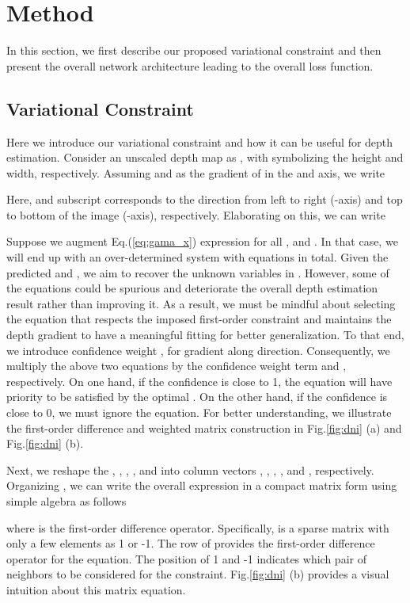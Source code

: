 \documentclass{article} \usepackage{iclr2023_conference, times}
\begin{document}
\section{Method}
In this section, we first describe our proposed variational constraint and then present the overall network architecture leading to the overall loss function.



\subsection{Variational Constraint}\label{ssec:vlayer}
Here we introduce our variational constraint and how it can be useful for depth estimation. Consider an unscaled depth map as , with  symbolizing the height and width, respectively. Assuming  and  as the gradient of  in the  and  axis, we write

Here,  and  subscript corresponds to the direction from left to right (-axis) and top to bottom of the image (-axis), respectively. Elaborating on this, we can write 




Suppose we augment Eq.(\ref{eq:gama_x}) expression for all ,  and . 
In that case, we will end up with an over-determined system with  equations in total. Given the predicted  and , we aim to recover the  unknown variables in .
However, some of the equations could be spurious and deteriorate the overall depth estimation result rather than improving it. As a result, we must be mindful about selecting the equation that respects the imposed first-order constraint and maintains the depth gradient to have a meaningful fitting for better generalization. To that end, we introduce confidence weight ,  for gradient along  direction. Consequently, we multiply the above two equations by the confidence weight term  and , respectively. On one hand, if the confidence is close to 1, the equation will have priority to be satisfied by the optimal . On the other hand, if the confidence is close to 0, we must ignore the equation. For better understanding, we illustrate the first-order difference and weighted matrix construction in Fig.\ref{fig:dni} (a) and Fig.\ref{fig:dni} (b).

Next, we reshape the , , , , and  into column vectors , , ,
, 
and , respectively. Organizing , we can write the overall expression in a compact matrix form  using simple algebra as follows




where  is the first-order difference operator. Specifically,  is a sparse matrix with only a few elements as 1 or -1. The  row of  provides the first-order difference operator for the  equation. The position of 1 and -1 indicates which pair of neighbors to be considered for the constraint. Fig.\ref{fig:dni} (b) provides a visual intuition about this matrix equation.
\end{document}
